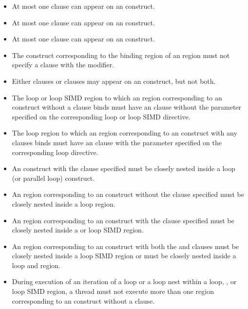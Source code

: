 \begin{itemize}
\item At most one  clause can appear on an  construct.

\item At most one  clause can appear on an  construct.

\item At most one  clause can appear on an  construct.

\item The construct corresponding to the binding region of an 
    region must not specify a  clause with the 
    modifier.

\item Either {} clauses or 
clauses may appear on an  construct, but not both.

\item The loop or loop SIMD region to which an 
region corresponding to an  construct without a 
clause binds must have an  clause without the parameter
specified on the corresponding loop or loop SIMD directive.

\item The loop region to which an  region corresponding to an
 construct with any 
clauses binds must have an  clause with the parameter specified
on the corresponding loop directive.

\item An  construct with the  clause specified must
be closely nested inside a loop (or parallel loop) construct.

\item An  region corresponding to an  construct
without the  clause specified must be closely nested inside a
loop region.

\item An  region corresponding to an  construct with
the  clause specified must be closely nested inside a
 or loop SIMD region.

\item An  region corresponding to an  construct with
  both the  and  clauses must be closely nested inside
  a loop SIMD region or must be closely nested inside a loop and 
  region.

\item During execution of an iteration of a loop or a loop nest within a loop, , or loop SIMD
region, a thread must not execute more than one  region
corresponding to an  construct without a  clause.
\end{itemize}
